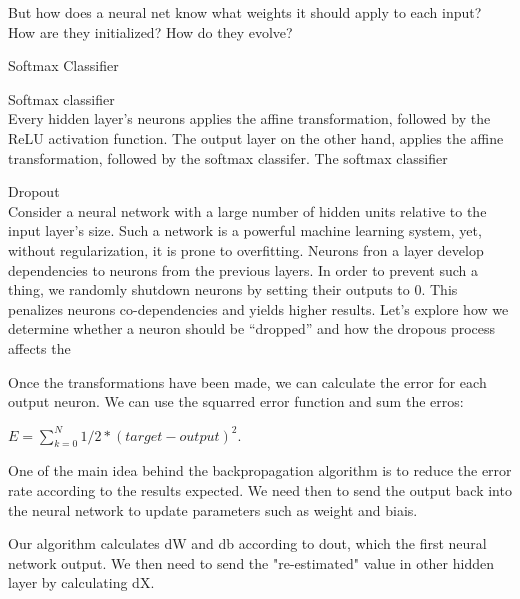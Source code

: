 But how does a neural net know what weights it should apply to each input?
How are they initialized?
How do they evolve?

   \item Softmax Classifier
   
    
   \item Softmax classifier\\
     Every hidden layer's neurons applies the affine transformation, followed by the ReLU activation function.
     The output layer on the other hand,  applies the affine transformation, followed by the softmax classifer.
     The softmax classifier 




   \item Dropout\\
     Consider a neural network with a large number of hidden units relative to the input layer's size.
     Such a network is a powerful machine learning system, yet, without regularization, it is prone to overfitting.
     Neurons fron a layer develop dependencies to neurons from the previous layers.
     In order to prevent such a thing, we randomly shutdown neurons by setting their outputs to 0.
     This penalizes neurons co-dependencies and yields higher results.
     Let's explore how we determine whether a neuron should be ``dropped'' and how the dropous process affects the 

Once the transformations have been made, we can calculate the error for each output neuron. We can use the squarred error function and sum the erros:

$E = \sum_{k=0}^{N} 1/2*(target - output)^2$.

One of the main idea behind the backpropagation algorithm is to reduce the error rate according to the results expected. We need then to send the output back into the neural network to update parameters such as weight and biais. 

Our algorithm calculates dW and db according to dout, which the first neural network output.
We then need to send the "re-estimated" value in other hidden layer by calculating dX.

